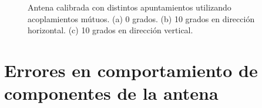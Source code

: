 \begin{figure}[H]
	\centering
 	
		\caption{Antena calibrada con distintos apuntamientos utilizando acoplamientos mútuos. (a) 0 grados. (b) 10 grados en 
		dirección horizontal. (c) 10 grados en dirección vertical.}
	\label{fig:deadTRMsMutual}
\end{figure}


\section{Errores en comportamiento de componentes de la antena}

